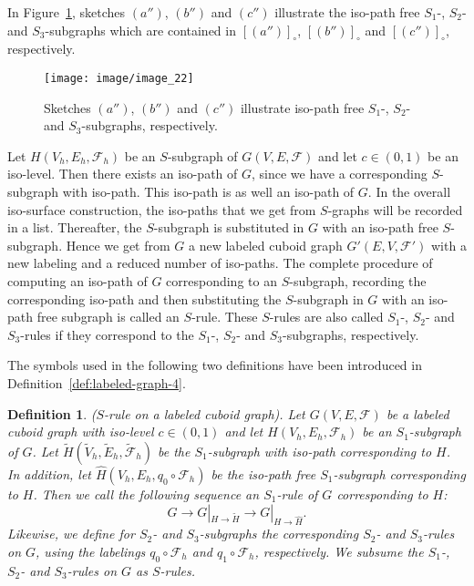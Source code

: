 \documentclass[a4paper,11pt]{article}
\newtheorem{definition}[theorem]{Definition}
\begin{document}
In Figure~\ref{image_22}, sketches $(a'')$, $(b'')$ and $(c'')$ illustrate the iso-path
free \mbox{$S_1$-,} $S_2$- and $S_3$-subgraphs which are contained in $[(a'')]_{\circ}$, $[(b'')]_{\circ}$
and $[(c'')]_{\circ}$, respectively.
\begin{figure}[!ht]
\texttt{[image: image/image\_22]}
\caption{Sketches $(a'')$, $(b'')$ and $(c'')$ illustrate iso-path free $S_1$-, $S_2$-
and $S_3$-subgraphs, respectively.}
\label{image_22}
\end{figure}
\FloatBarrier
Let $H(V_h,E_h,\mathcal{F}_h)$ be an $S$-subgraph of $G(V,E,\mathcal{F})$ and let $c\in (0,1)$ be
an iso-level. Then there exists an iso-path of $G$, since we have a corresponding $S$-subgraph with
iso-path. This iso-path is as well an iso-path of $G$. In the overall iso-surface construction,
the iso-paths that we get from $S$-graphs will be recorded in a list. Thereafter, the $S$-subgraph
is substituted in $G$ with an iso-path free $S$-subgraph. Hence we get from $G$ a new labeled cuboid
graph $G'(E,V,\mathcal{F}')$ with a new labeling and a reduced number of iso-paths. The complete
procedure of computing an iso-path of $G$ corresponding to an $S$-subgraph, recording the corresponding
iso-path and then substituting the $S$-subgraph in $G$ with an iso-path free subgraph is called
an $S$-rule. These $S$-rules are also called $S_1$-, $S_2$- and $S_3$-rules if they correspond to
the $S_1$-, $S_2$- and $S_3$-subgraphs, respectively.

The symbols used in the following two definitions have been introduced in
Definition~\ref{def:labeled-graph-4}.
\begin{definition}($S$-rule on a labeled cuboid graph). Let $G(V,E,\mathcal{F})$ be a labeled cuboid
graph with iso-level $c\in (0,1)$ and let $H(V_h,E_h,\mathcal{F}_h)$ be an $S_1$-subgraph of $G$.
Let $\tilde{H}(\tilde{V}_h,\tilde{E}_h,\tilde{\mathcal{F}}_h)$ be the $S_1$-subgraph with iso-path
corresponding to $H$. In addition, let  $\hat{H}(V_h,E_h,q_0\circ\mathcal{F}_h)$
be the iso-path free $S_1$-subgraph corresponding to $H$. Then we call the following sequence an
$S_1$-rule of $G$ corresponding to $H$:
\begin{equation}
G\longrightarrow G|_{H\rightarrow \tilde{H}}\longrightarrow G|_{H\rightarrow \hat{H}}.
\label{eq:iso-path-8}
\end{equation}
Likewise, we define for  $S_2$- and $S_3$-subgraphs the corresponding $S_2$- and $S_3$-rules on $G$,
using the labelings $q_0\circ\mathcal{F}_h$ and $q_1\circ\mathcal{F}_h$, respectively.
We subsume the $S_1$-, $S_2$- and $S_3$-rules on $G$ as $S$-rules.
\label{def:iso-path-20}
\end{definition}
\end{document}
